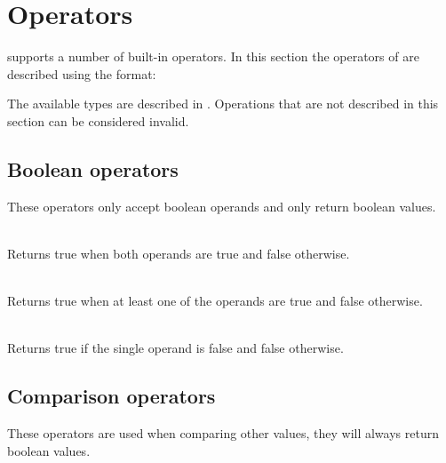 \section{Operators}

\productname{} supports a number of built-in operators. In this section the operators
of \productname{} are described using the format:


The available types are described in .
Operations that are not described in this section can be considered invalid.

\subsection{Boolean operators}

These operators only accept boolean operands and only return boolean values.

\begin{dlist}
  \item {}\\
    Returns true when both operands are true and false otherwise. 
  \item {}\\
    Returns true when at least one of the operands are true and false otherwise.
  \item {}\\
    Returns true if the single operand is false and false otherwise.
\end{dlist}

\subsection{Comparison operators}

These operators are used when comparing other values, they will always return
boolean values.

